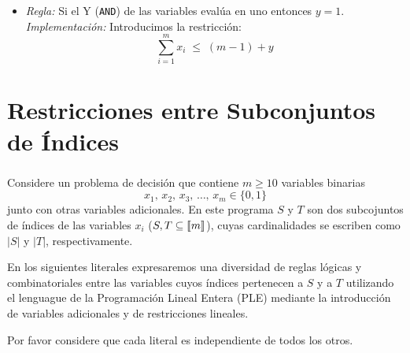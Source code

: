 \documentclass[ 10pt, xcolor = dvipsnames]{beamer}
\begin{document}
\begin{frame}[allowframebreaks]
\frametitle{\insertsection}

\begin{itemize}
\item \emph{Regla:} Si el Y (\texttt{AND}) de las variables eval\'ua en uno entonces $y = 1$. \\[1ex] \emph{Implementaci\'on:} Introducimos la restricci\'on: 
\[
\sum_{i=1}^m x_i \; \leq \; (m-1) + y
\]
\end{itemize}

\end{frame}

\section{Restricciones entre Subconjuntos de \'Indices}

\begin{frame}[allowframebreaks]
\frametitle{\insertsection}

Considere un problema de decisi\'on que contiene $m \geq 10$ variables binarias
\[
x_1, \, x_2, \, x_3, \, \dots, \, x_m \in \{ 0, 1 \}
\]
junto con otras variables adicionales. En este programa $S$ y $T$ son dos subcojuntos de \'indices de las variables $x_i$ (\ie $S, T \subseteq \llbracket m \rrbracket$), cuyas cardinalidades se escriben \linebreak como $|S|$ y $|T|$, respectivamente. 

En los siguientes literales expresaremos una diversidad de reglas l\'ogicas y combinatoriales entre las variables cuyos \'indices pertenecen a $S$ y a $T$ utilizando el lenguague de la Programaci\'on Lineal Entera (PLE) mediante la introducci\'on de variables adicionales y de restricciones lineales. 

Por favor considere que cada literal es independiente de todos los otros. 

\end{frame}
\end{document}
